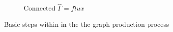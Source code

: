 \begin{figure}[H]
\begin{subfigure}[b]{.4\textwidth}
     \caption{Connected $\hat{\Gamma} = flux$}
     \end{subfigure}
        \caption{Basic steps within in the the graph production process}
      \label{fig:resmeth}
\end{figure}
% 
% 
% 
% 
% 
% 
